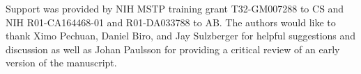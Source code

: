 Support was provided by NIH MSTP training grant T32-GM007288 to CS and NIH R01-CA164468-01 and R01-DA033788 to AB. The authors would like to thank Ximo Pechuan, Daniel Biro, and Jay Sulzberger for helpful suggestions and discussion as well as Johan Paulsson for providing a critical review of an early version of the manuscript.

